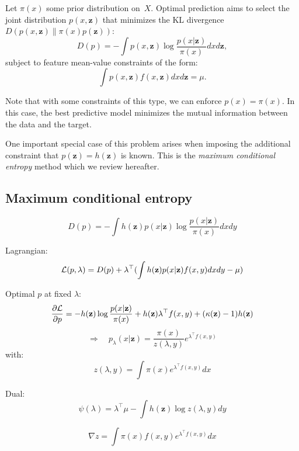 \documentclass[english]{scrartcl}
\def\y{{\mathbf{y}}}
\def\y{{\mathbf{z}}}
\begin{document}
Let $\pi(x)$ some prior distribution on~$X$. Optimal prediction aims to select the joint distribution $p(x,\y)$ that minimizes the KL divergence $D(p(x,\y)\|\pi(x)p(\y))$:
$$
D(p) = -\int p(x,\y) \log \frac{p(x|\y)}{\pi(x)} dx d\y,
$$ subject to feature mean-value constraints of the form:
$$
\int p(x,\y) f(x,\y) dx d\y = \mu.
$$

Note that with some constraints of this type, we can enforce $p(x)=\pi(x)$. In this case, the best predictive model minimizes the mutual information between the data and the target.

One important special case of this problem arises when imposing the additional constraint that $p(\y)=h(\y)$ is known. This is the {\em maximum conditional entropy} method \cite{BergerA-96} which we review hereafter. 






\subsection{Maximum conditional entropy}

$$
D(p) = -\int h(\y)p(x|\y) \log \frac{p(x|\y)}{\pi(x)} dxdy
$$

Lagrangian:
$$
{\cal L}(p,\lambda) = D(p) + \lambda^\top (\int h(\y)p(x|\y)f(x,y)dxdy - \mu)
$$

Optimal $p$ at fixed $\lambda$:
$$
\frac{\partial{\cal L}}{\partial p}
=
- h(\y) \log \frac{p(x|\y)}{\pi(x)} + h(\y) \lambda^\top f(x,y) + (\kappa(\y)-1)h(\y)
$$
$$
\Rightarrow
\quad
p_{\lambda}(x|\y) = \frac{\pi(x)}{z(\lambda,y)} e^{\lambda^\top f(x,y)}
$$
with:
$$
z(\lambda,y) = \int \pi(x) e^{\lambda^\top f(x,y)} dx
$$

Dual:
$$
\psi(\lambda) = \lambda^\top \mu - \int h(\y) \log z(\lambda, y) dy 
$$

$$
\nabla z
=
\int \pi(x) f(x,y)  e^{\lambda^\top f(x,y)} dx
$$
\end{document}
